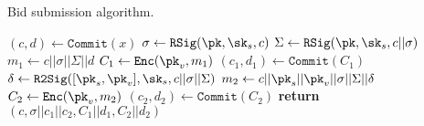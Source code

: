 \begin{algorithm}
    \caption{Bid submission algorithm.}
    \label{alg:bid}
    \begin{algorithmic}[1]
        \State $(c,d) \gets \mathtt{Commit}(x)$
        \State $\sigma \gets \mathtt{RSig}(\pk, \sk_s, c)$
        \State $\Sigma \gets \mathtt{RSig}(\pk, \sk_s, c || \sigma)$
        \State $m_1 \gets c || \sigma || \Sigma || d$
        \State $C_1 \gets \mathtt{Enc}(\pk_v, m_1)$
        \State $(c_1, d_1) \gets \mathtt{Commit}(C_1)$
        \State $\delta \gets \mathtt{R2Sig}([\pk_s, \pk_v], \sk_s, c || \sigma || \Sigma)$
        \State $m_2 \gets c || \pk_s || \pk_v || \sigma || \Sigma || \delta$
        \State $C_2 \gets \mathtt{Enc}(\pk_v, m_2)$
        \State $(c_2, d_2) \gets \mathtt{Commit}(C_2)$
        \State \textbf{return} $(c, \sigma || c_1 || c_2, C_1 || d_1, C_2 || d_2)$
        \EndFunction
    \end{algorithmic}
\end{algorithm}